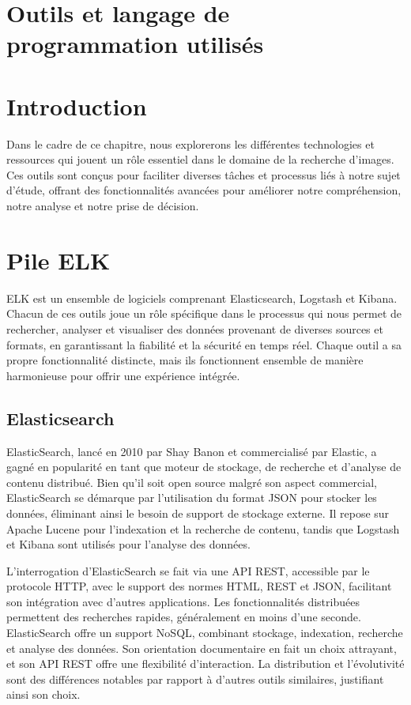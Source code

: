 \documentclass{article}
\begin{document}
	\section{Outils et langage de programmation utilisés}
	
	\section{Introduction}
	Dans le cadre de ce chapitre, nous explorerons les différentes technologies et ressources qui jouent un rôle essentiel dans le domaine de la recherche d'images. Ces outils sont conçus pour faciliter diverses tâches et processus liés à notre sujet d'étude, offrant des fonctionnalités avancées pour améliorer notre compréhension, notre analyse et notre prise de décision.
	
	\section{Pile ELK}
	ELK est un ensemble de logiciels comprenant Elasticsearch, Logstash et Kibana. Chacun de ces outils joue un rôle spécifique dans le processus qui nous permet de rechercher, analyser et visualiser des données provenant de diverses sources et formats, en garantissant la fiabilité et la sécurité en temps réel. Chaque outil a sa propre fonctionnalité distincte, mais ils fonctionnent ensemble de manière harmonieuse pour offrir une expérience intégrée.
	
	\subsection{Elasticsearch}
	ElasticSearch, lancé en 2010 par Shay Banon et commercialisé par Elastic, a gagné en popularité en tant que moteur de stockage, de recherche et d'analyse de contenu distribué. Bien qu'il soit open source malgré son aspect commercial, ElasticSearch se démarque par l'utilisation du format JSON pour stocker les données, éliminant ainsi le besoin de support de stockage externe. Il repose sur Apache Lucene pour l'indexation et la recherche de contenu, tandis que Logstash et Kibana sont utilisés pour l'analyse des données.
	
	L'interrogation d'ElasticSearch se fait via une API REST, accessible par le protocole HTTP, avec le support des normes HTML, REST et JSON, facilitant son intégration avec d'autres applications. Les fonctionnalités distribuées permettent des recherches rapides, généralement en moins d'une seconde. ElasticSearch offre un support NoSQL, combinant stockage, indexation, recherche et analyse des données. Son orientation documentaire en fait un choix attrayant, et son API REST offre une flexibilité d'interaction. La distribution et l'évolutivité sont des différences notables par rapport à d'autres outils similaires, justifiant ainsi son choix.
	
\end{document}
